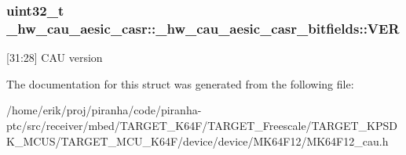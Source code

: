 \subsubsection[{\texorpdfstring{V\+ER}{VER}}]{\setlength{\rightskip}{0pt plus 5cm}uint32\+\_\+t \+\_\+hw\+\_\+cau\+\_\+aesic\+\_\+casr\+::\+\_\+hw\+\_\+cau\+\_\+aesic\+\_\+casr\+\_\+bitfields\+::\+V\+ER}\hypertarget{struct__hw__cau__aesic__casr_1_1__hw__cau__aesic__casr__bitfields_a2bf2fe8200eabf9fd8a7c33d883a7f2a}{}\label{struct__hw__cau__aesic__casr_1_1__hw__cau__aesic__casr__bitfields_a2bf2fe8200eabf9fd8a7c33d883a7f2a}
\mbox{[}31\+:28\mbox{]} C\+AU version 

The documentation for this struct was generated from the following file\+:\begin{DoxyCompactItemize}
\item 
/home/erik/proj/piranha/code/piranha-\/ptc/src/receiver/mbed/\+T\+A\+R\+G\+E\+T\+\_\+\+K64\+F/\+T\+A\+R\+G\+E\+T\+\_\+\+Freescale/\+T\+A\+R\+G\+E\+T\+\_\+\+K\+P\+S\+D\+K\+\_\+\+M\+C\+U\+S/\+T\+A\+R\+G\+E\+T\+\_\+\+M\+C\+U\+\_\+\+K64\+F/device/device/\+M\+K64\+F12/M\+K64\+F12\+\_\+cau.\+h\end{DoxyCompactItemize}
